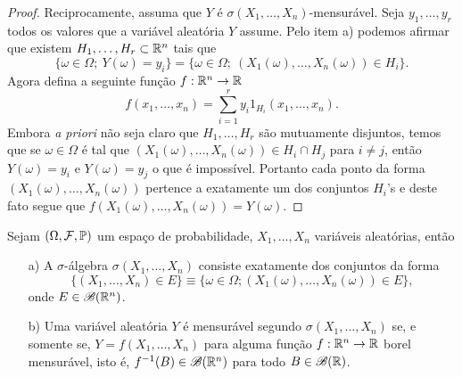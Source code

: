 \begin{proof}
Reciprocamente, assuma que $Y$ é $\sigma(X_1,\ldots,X_n)$-mensurável.
Seja $y_1,\ldots,y_r$ todos os valores que a variável aleatória 
$Y$ assume. Pelo item a) podemos afirmar que existem 
$H_1,\ldots,H_r\subset \mathbb{R}^n$ tais que 
	\[
	\{\omega\in\Omega;\ Y(\omega)=y_i\}
	=
	\{\omega\in\Omega;\ (X_1(\omega),\ldots,X_n(\omega))\in H_i\}.
	\]
Agora defina a seguinte função $f:\mathbb{R}^n\to\mathbb{R}$
	\[
		f(x_1,\ldots,x_n)=\sum_{i=1}^r y_i 1_{H_i}(x_1,\ldots,x_n).
	\] 
Embora {\it a priori} não seja claro que $H_1,\ldots,H_r$
são mutuamente disjuntos, temos que se $\omega\in\Omega$ é tal que
$(X_1(\omega),\ldots,X_n(\omega))\in H_i\cap H_j$
para $i\neq j$,
então $Y(\omega)=y_i$ e $Y(\omega)=y_j$ o que é impossível.
Portanto cada ponto da forma $(X_1(\omega),\ldots,X_n(\omega))$
pertence a exatamente um dos conjuntos $H_i$'s e deste fato segue 
que $f(X_1(\omega),\ldots,X_n(\omega))=Y(\omega)$.
\end{proof}






















\begin{teorema}\label{teo-f(X1,...,X_n)-sigma(X1,...,X_n)}
	Sejam $(\Omega,\mathcal{F},\mathbb{P})$ um espaço de probabilidade,
	$X_1,\ldots,X_n$ variáveis aleatórias, então 
\begin{itemize}
	\item[a)]
	A $\sigma$-álgebra $\sigma(X_1,\ldots,X_n)$ 
	consiste exatamente dos conjuntos da forma
	\[
		\{(X_1,\ldots,X_n)\in E\} 
		\equiv
		\{\omega\in\Omega; (X_1(\omega),\ldots,X_n(\omega))\in E\},
	\]
	onde $E\in \mathscr{B}(\mathbb{R}^n)$.
	
	\item[b)]
	Uma variável aleatória $Y$ é mensurável segundo 
	$\sigma(X_1,\ldots,X_n)$ se, e somente se,
	$Y=f(X_1,\ldots,X_n)$ para alguma função 
	$f:\mathbb{R}^n\to\mathbb{R}$ borel mensurável,
	isto é, $f^{-1}(B)\in\mathscr{B}(\mathbb{R}^n)$ para todo
	$B\in\mathscr{B}(\mathbb{R})$.
\end{itemize}
\end{teorema}


